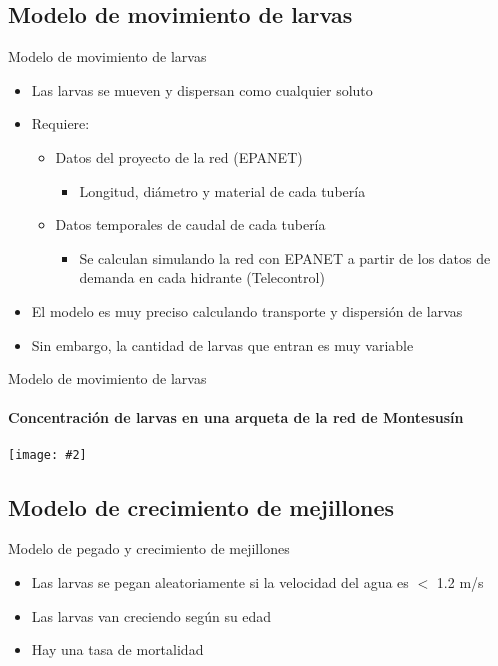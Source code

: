 \documentclass[pdr]{beamer}
\newcommand{\FIGURE}[2]
{
	\begin{center}
		\texttt{[image: \#2]}
	\end{center}
}
\begin{document}
\subsection{Modelo de movimiento de larvas}

\begin{frame}{Modelo de movimiento de larvas}
	\begin{itemize}
		\item Las larvas se mueven y dispersan como cualquier soluto
		\item Requiere:
		\begin{itemize}
			\item Datos del proyecto de la red (EPANET)
			\begin{itemize}
				\item Longitud, diámetro y material de cada
					tubería
			\end{itemize}
			\item Datos temporales de caudal de cada tubería
			\begin{itemize}
				\item Se calculan simulando la red con EPANET a
					partir de los datos de demanda en cada
					hidrante (Telecontrol)
			\end{itemize}
		\end{itemize}
		\item El modelo es muy preciso calculando transporte y
			dispersión de larvas
		\item Sin embargo, la cantidad de larvas que entran es muy
			variable
	\end{itemize}
\end{frame}

\begin{frame}{Modelo de movimiento de larvas}
	\framesubtitle{Concentración de larvas en una arqueta de la red de
		Montesusín}
	\FIGURE{\textwidth}{mussel-input-measured.eps}
\end{frame}

\subsection{Modelo de crecimiento de mejillones}

\begin{frame}{Modelo de pegado y crecimiento de mejillones}
	\begin{itemize}
		\item Las larvas se pegan aleatoriamente si la velocidad del
			agua es $<$ 1.2 m/s
		\item Las larvas van creciendo según su edad
		\item Hay una tasa de mortalidad
	\end{itemize}
\end{frame}
\end{document}
